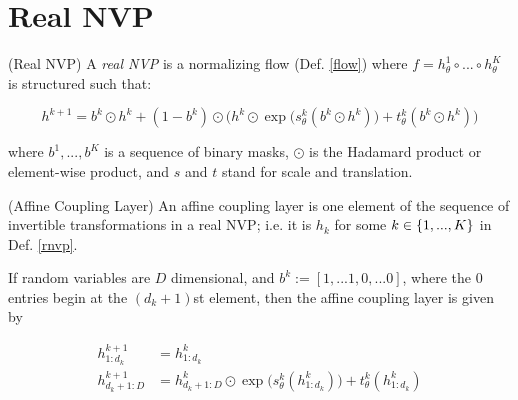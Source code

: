 \documentclass[10pt]{beamer}
\begin{document}
%
%



\section{Real NVP}

\begin{definition}{(Real NVP)} \label{rnvp}
A \textit{real NVP} is a normalizing flow (Def. \ref{flow}) where $f=h_\theta^1 \circ ... \circ h_\theta^K$ is structured such that:

\[h^{k+1} = b^k \odot h^k + (1-b^k) \odot \bigg( h^k \odot \exp \big( s^k_\theta(b^k \odot h^k) \big) + t^k _\theta(b^k \odot h^k ) \bigg)  \]
 
where $b^1, ..., b^K$ is a sequence of binary masks, $\odot$ is the Hadamard product or element-wise product, and $s$ and $t$ stand for scale and translation. %
\end{definition}


\begin{definition}{(Affine Coupling Layer)} \label{acl}
An affine coupling layer is one element of the sequence of invertible transformations in a real NVP; i.e. it is $h_k $ for some $k  \in \{ {1,...,K} \}$ in Def. \ref{rnvp}. 
\end{definition}

\begin{example}\label{rnvp_example}

If random variables are $D$ dimensional, and $b^k := [1,... 1, 0,...0]$, where the 0 entries begin at the $(d_{k}+1)$st element, then the affine coupling layer is given by

\begin{align*}
h^{k+1}_{1:d_k} &= h^k_{1:d_k} \\
h^{k+1}_{d_k+1:D} &= h^k_{d_k+1:D} \odot \exp \big( s^k_\theta(h^k_{1:d_k}) \big) + t^k_\theta(h^k_{1:d_k})  \\
\end{align*}

\end{example}
\end{document}
